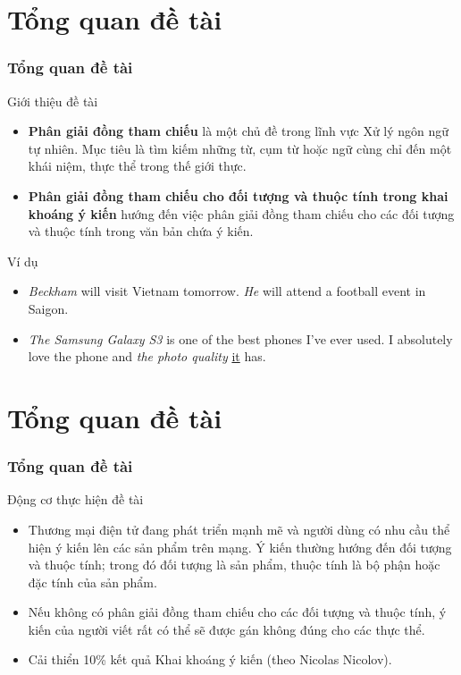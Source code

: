 \documentclass[9pt,xcolor=table]{beamer}
\begin{document}
	\section{Tổng quan đề tài}
	\begin{frame}
		\frametitle{Tổng quan đề tài}
		\begin{block}{Giới thiệu đề tài}
			\begin{itemize}
				\item{\textbf{Phân giải đồng tham chiếu} là một chủ đề trong lĩnh vực Xử lý ngôn ngữ tự nhiên. Mục tiêu là tìm kiếm những từ, cụm từ hoặc ngữ cùng chỉ đến một khái niệm, thực thể trong thế giới thực.}
				\item{\textbf{Phân giải đồng tham chiếu cho đối tượng và thuộc tính trong khai khoáng ý kiến} hướng đến việc phân giải đồng tham chiếu cho các đối tượng và thuộc tính trong văn bản chứa ý kiến.}
			\end{itemize}
		\end{block}		

		\begin{block}{Ví dụ}
		\begin{itemize}
			\item{\textit{Beckham} will visit Vietnam tomorrow. \textit{He} will attend a football event in Saigon.}
			\item{\textit{The Samsung Galaxy S3} is one of the best phones I’ve ever used. I absolutely
love the phone and \textit{the photo quality} \underline{it} has.}
		\end{itemize}
		\end{block}		
	\end{frame}


	\section{Tổng quan đề tài}
	\begin{frame}
		\frametitle{Tổng quan đề tài}
		\begin{block}{Động cơ thực hiện đề tài}
			\begin{itemize}	
				\item{Thương mại điện tử đang phát triển mạnh mẽ và người dùng có nhu cầu thể hiện ý kiến lên các sản phẩm trên mạng. Ý kiến thường hướng đến đối tượng và thuộc tính; trong đó đối tượng là sản phẩm, thuộc tính là bộ phận hoặc đặc tính của sản phẩm.}
				\item{Nếu không có phân giải đồng tham chiếu cho các đối tượng và thuộc tính, ý kiến của người viết rất có thể sẽ được gán không đúng cho các thực thể.}
				\item{Cải thiển 10\% kết quả Khai khoáng ý kiến (theo Nicolas Nicolov).}
			\end{itemize}		
		\end{block}		
	\end{frame}
\end{document}
